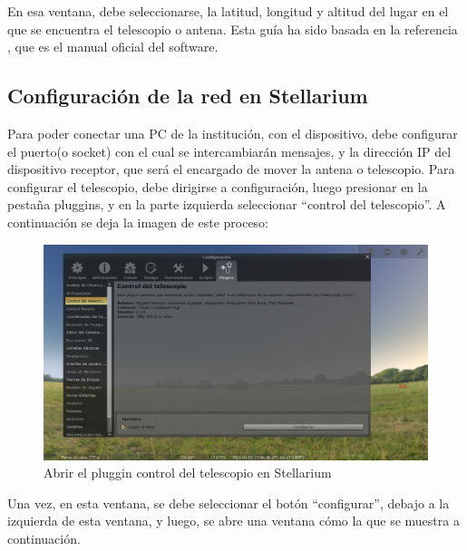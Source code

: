 En esa ventana, debe seleccionarse, la latitud, longitud y altitud del lugar en el que se encuentra el telescopio o antena. Esta guía ha sido basada en la referencia \cite{mgpredict}, que es el manual oficial del software. 

\subsection{Configuración de la red en Stellarium} \label{sub:conf_stellarium_red}


Para poder conectar una PC de la institución, con el dispositivo, debe configurar el puerto(o socket) con el cual se intercambiarán mensajes, y la dirección IP del dispositivo receptor, que será el encargado de mover la antena o telescopio. Para configurar el telescopio, debe dirigirse a configuración, luego presionar en la pestaña pluggins, y en la parte izquierda seleccionar ``control del telescopio''. A continuación se deja la imagen de este proceso: 
 
\begin{figure}[H]
	\includegraphics[width=\textwidth]{conf_tel_red1} 
	\caption{Abrir el pluggin control del telescopio en Stellarium} 
	\label{fig:stell_conf_red}
\end{figure}

Una vez, en esta ventana, se debe seleccionar el botón ``configurar'', debajo a la izquierda de esta ventana, y luego, se abre una ventana cómo la que se muestra a continuación. 

